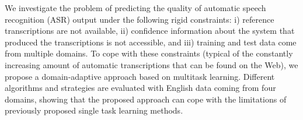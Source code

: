 We investigate the problem of predicting the quality of automatic speech recognition (ASR) output under the following rigid constraints: i) reference transcriptions are not available, ii) confidence information about the system that produced the transcriptions is not accessible, and iii) training and test data come from multiple  domains. To cope with these constraints (typical of the constantly increasing amount of automatic transcriptions  that can be found on the Web), we propose a domain-adaptive approach based on multitask learning. Different algorithms and strategies are evaluated with English data coming from four domains, showing that the proposed approach can cope with the limitations of previously proposed single task learning methods.
